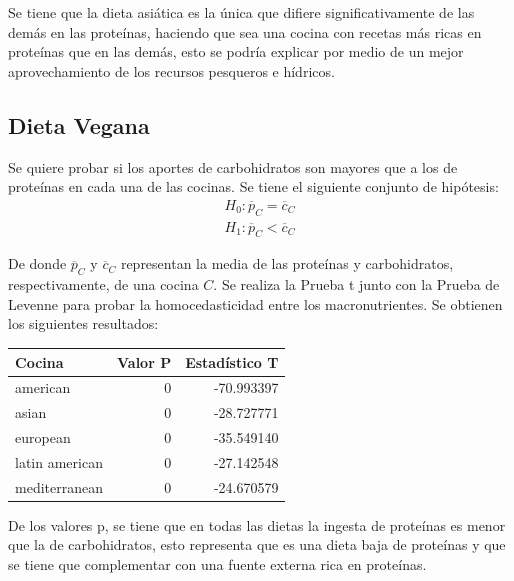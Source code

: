 \documentclass[12pt,a4paper]{article}
\begin{document}
{{            Se tiene que la dieta asiática es la única que difiere significativamente 
            de las demás en las proteínas, haciendo que sea una cocina con recetas 
            más ricas en proteínas que en las demás, esto se podría explicar por 
            medio de un mejor aprovechamiento de los recursos pesqueros e hídricos.
        }

        \subsection{Dieta Vegana}
        {
            Se quiere probar si los aportes de carbohidratos son mayores 
            que a los de proteínas en cada una de las cocinas. Se tiene el 
            siguiente conjunto de hipótesis:
            \begin{align*}
                H_0 : \overline{p}_C = \overline{c}_C \\
                H_1 : \overline{p}_C < \overline{c}_C
            \end{align*}

            De donde $\overline{p}_C$ y $\overline{c}_C$ representan la media 
            de las proteínas y carbohidratos, respectivamente, de una cocina $C$. 
            Se realiza la Prueba t junto con la Prueba de Levenne para 
            probar la homocedasticidad entre los macronutrientes. Se obtienen 
            los siguientes resultados:

            \begin{center}
                \begin{tabular}{l|rr}
                \toprule
                    Cocina & Valor P & Estadístico T \\
                \midrule
                    american       & 0 & -70.993397 \\
                    asian          & 0 & -28.727771 \\
                    european       & 0 & -35.549140 \\
                    latin american & 0 & -27.142548 \\
                    mediterranean  & 0 & -24.670579 \\
                \bottomrule
                \end{tabular}
            \end{center}

            De los valores p, se tiene que en todas las dietas la ingesta de 
            proteínas es menor que la de carbohidratos, esto representa que 
            es una dieta baja de proteínas y que se tiene que complementar 
            con una fuente externa rica en proteínas.
        }

}
\end{document}
